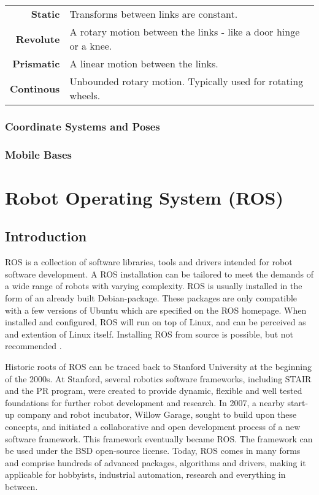 \begin{center}
	\begin{tabular}{ r p{10cm} }
	\textbf{Static} & Transforms between links are constant.\\
	\textbf{Revolute} &  A rotary motion between the links - like a door hinge or a knee.\\
	\textbf{Prismatic} & A linear motion between the links. \\
	\textbf{Continous} & Unbounded rotary motion. Typically used for rotating wheels. \\
	\end{tabular}
\end{center}

\subsubsection{Coordinate Systems and Poses}

\subsubsection{Mobile Bases}

\section{Robot Operating System (ROS)}
\label{sec:ros}
\subsection{Introduction}

\ac{ROS} is a collection of software libraries, tools and drivers intended for robot software development. A \ac{ROS} installation can be tailored to meet the demands of a wide range of robots with varying complexity. \ac{ROS} is usually installed in the form of an already built Debian-package. These packages are only compatible with a few versions of Ubuntu which are specified on the \ac{ROS} homepage. When installed and configured, \ac{ROS} will run on top of Linux, and can be perceived as and extention of Linux itself. Installing \ac{ROS} from source is possible, but not recommended \cite{ROS_install}.

Historic roots of \ac{ROS} can be traced back to Stanford University at the beginning of the 2000s. At Stanford, several robotics software frameworks, including \ac{STAIR} and the \ac{PR} program, were created to provide dynamic, flexible and well tested foundations for further robot development and research. In 2007, a nearby start-up company and robot incubator, Willow Garage, sought to build upon these concepts, and initiated a collaborative and open development process of a new software framework. This framework eventually became \ac{ROS}\cite{ROS_history}\cite{rosbook15}. The framework can be used under the BSD open-source license\cite{BCD_license}. Today, \ac{ROS} comes in many forms and comprise hundreds of advanced packages, algorithms and drivers, making it applicable for hobbyists, industrial automation, research and everything in between. 

